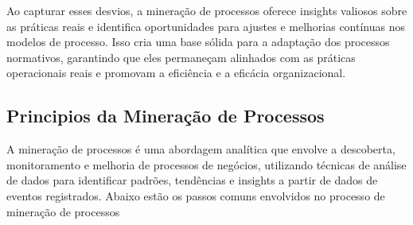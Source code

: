 \documentclass[tcc2]{classe_uftex/uftex}
\begin{document}
Ao capturar esses desvios, a mineração de processos oferece insights valiosos sobre as práticas reais e identifica oportunidades para ajustes e melhorias contínuas nos modelos de processo. Isso cria uma base sólida para a adaptação dos processos normativos, garantindo que eles permaneçam alinhados com as práticas operacionais reais e promovam a eficiência e a eficácia organizacional.



\subsection{Principios da Mineração de Processos}

A mineração de processos é uma abordagem analítica que envolve a descoberta, monitoramento e melhoria de processos de negócios, utilizando técnicas de análise de dados para identificar padrões, tendências e insights a partir de dados de eventos registrados. Abaixo estão os passos comuns envolvidos no processo de mineração de processos\cite{van2012process}
\end{document}
